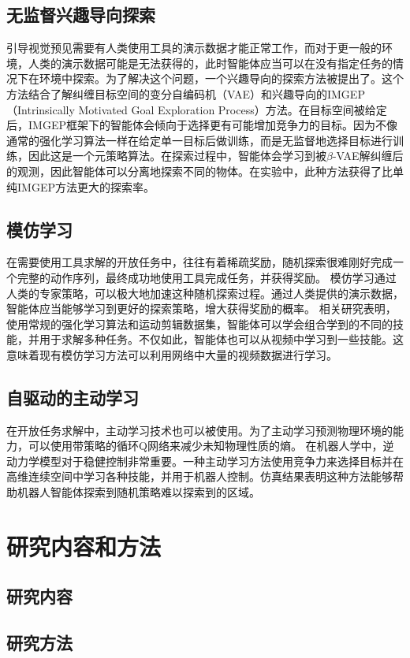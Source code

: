         \subsection{无监督兴趣导向探索}
        引导视觉预见需要有人类使用工具的演示数据才能正常工作，而对于更一般的环境，人类的演示数据可能是无法获得的，此时智能体应当可以在没有指定任务的情况下在环境中探索。为了解决这个问题，一个兴趣导向的探索方法被提出了\cite{laversanne-finot2018curiosity}。这个方法结合了解纠缠目标空间的变分自编码机（VAE）和兴趣导向的IMGEP（Intrinsically Motivated Goal Exploration Process）方法\cite{DBLP:journals/corr/abs-1708-02190}。在目标空间被给定后，IMGEP框架下的智能体会倾向于选择更有可能增加竞争力的目标。因为不像通常的强化学习算法一样在给定单一目标后做训练，而是无监督地选择目标进行训练，因此这是一个元策略算法。在探索过程中，智能体会学习到被$\beta$-VAE解纠缠后的观测，因此智能体可以分离地探索不同的物体。在实验中，此种方法获得了比单纯IMGEP方法更大的探索率。

        \subsection{模仿学习}
        在需要使用工具求解的开放任务中，往往有着稀疏奖励，随机探索很难刚好完成一个完整的动作序列，最终成功地使用工具完成任务，并获得奖励。
        模仿学习通过人类的专家策略，可以极大地加速这种随机探索过程。通过人类提供的演示数据，智能体应当能够学习到更好的探索策略，增大获得奖励的概率。
        相关研究表明，使用常规的强化学习算法和运动剪辑数据集，智能体可以学会组合学到的不同的技能，并用于求解多种任务\cite{peng2018deepmimic}。不仅如此，智能体也可以从视频中学习到一些技能\cite{peng2019sfv}。这意味着现有模仿学习方法可以利用网络中大量的视频数据进行学习。

        \subsection{自驱动的主动学习}
        在开放任务求解中，主动学习技术也可以被使用。为了主动学习预测物理环境的能力，可以使用带策略的循环Q网络来减少未知物理性质的熵\cite{li2019active}。
        在机器人学中，逆动力学模型对于稳健控制非常重要。一种主动学习方法使用竞争力来选择目标并在高维连续空间中学习各种技能，并用于机器人控制\cite{baranes2013active}。仿真结果表明这种方法能够帮助机器人智能体探索到随机策略难以探索到的区域。

    \section{研究内容和方法}

        \subsection{研究内容}

        \subsection{研究方法}

